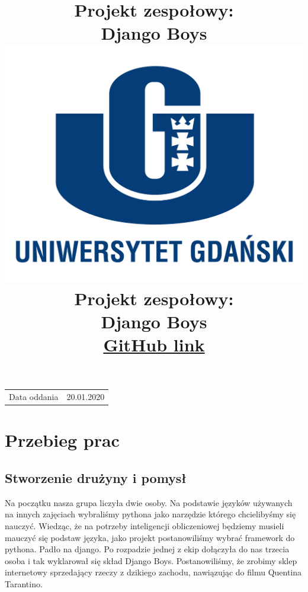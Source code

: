 \documentclass{article}
\title{Projekt zespołowy:\\Django Boys\\} %
\author{}
\date{}
\begin{document}
\title{\includegraphics[scale=0.7]{UG.jpg}\\[2cm]{Projekt zespołowy:\\Django Boys \\[10cm] \href{https://github.com/DjangoBo/Python}{GitHub link}}}
\maketitle%

\begin{center}
\begin{tabular}{l r}
Data oddania & 20.01.2020 \\ 
\end{tabular}
\end{center}


\newpage
\Large

\tableofcontents



\newpage
{}

\section{Przebieg prac}

\subsection{Stworzenie drużyny i pomysł}
\parindent24pt Na początku nasza grupa liczyła dwie osoby. Na podstawie języków używanych na innych zajęciach wybraliśmy pythona jako narzędzie którego chcielibyśmy się nauczyć. Wiedząc, że na potrzeby inteligencji obliczeniowej będziemy musieli mauczyć się podstaw języka, jako projekt postanowiliśmy wybrać framework do pythona. Padło na django. Po rozpadzie jednej z ekip dołączyła do nas trzecia osoba i tak wyklarował się skład Django Boys. Postanowiliśmy, że zrobimy sklep internetowy sprzedający rzeczy z dzikiego zachodu, nawiązując do filmu Quentina Tarantino.
\end{document}
